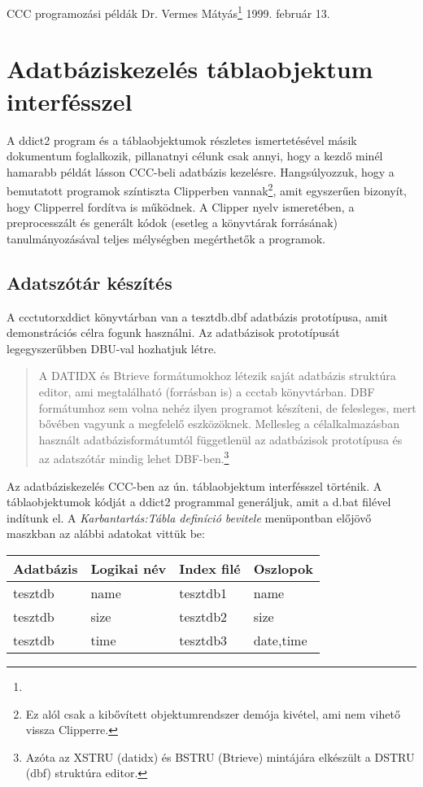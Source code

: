 
\pagetitle%
{CCC programozási példák}%
{Dr. Vermes Mátyás\footnote{\ComFirm}}%
{1999. február 13.}


\section{Adatbáziskezelés táblaobjektum interfésszel}

A ddict2 program és a táblaobjektumok részletes ismertetésével másik 
dokumentum foglalkozik, pillanatnyi célunk csak annyi, hogy a kezdő 
minél hamarabb példát lásson CCC-beli adatbázis kezelésre. Hangsúlyozzuk,
hogy a bemutatott programok színtiszta Clipperben vannak\footnote{
Ez alól csak a kibővített objektumrendszer demója kivétel, ami nem
vihető vissza Clipperre.}, amit egyszerűen
bizonyít, hogy Clipperrel fordítva is működnek. A Clipper nyelv ismeretében,
a preprocesszált és generált kódok (esetleg a könyvtárak forrásának) 
tanulmányozásával teljes mélységben megérthetők a programok.


\subsection{Adatszótár készítés}
A ccctutor\bslash xddict könyvtárban van a tesztdb.dbf
adatbázis prototípusa, amit demonstrációs célra fogunk használni. 
Az adatbázisok prototípusát legegyszerűbben DBU-val hozhatjuk létre. 
\begin{quote}
A DATIDX és Btrieve formátumokhoz létezik saját adatbázis struktúra
editor, ami  megtalálható (forrásban is) a ccctab könyvtárban.
DBF formátumhoz sem volna nehéz ilyen programot készíteni,
de felesleges, mert bővében vagyunk a megfelelő eszközöknek.
Mellesleg a célalkalmazásban használt adatbázisformátumtól függetlenül
az adatbázisok prototípusa és az adatszótár mindig lehet DBF-ben.\footnote{
Azóta az XSTRU (datidx) és BSTRU (Btrieve)
mintájára elkészült a DSTRU (dbf) struktúra editor.}
\end{quote} 

Az adatbáziskezelés CCC-ben az ún. táblaobjektum interfésszel
történik. A táblaobjektumok kódját a ddict2 programmal generáljuk,
amit a d.bat filével indítunk el. A {\em Karbantartás:Tábla definíció bevitele}
menüpontban előjövő maszkban az alábbi adatokat vittük be:

\begin{center}
\begin{tabular}{|l|l|l|l|} \hline
Adatbázis   & Logikai név & Index filé & Oszlopok   \\ \hline \hline
tesztdb     & name        & tesztdb1   & name       \\ \hline
tesztdb     & size        & tesztdb2   & size       \\ \hline
tesztdb     & time        & tesztdb3   & date,time  \\ \hline
\end{tabular}
\end{center}

